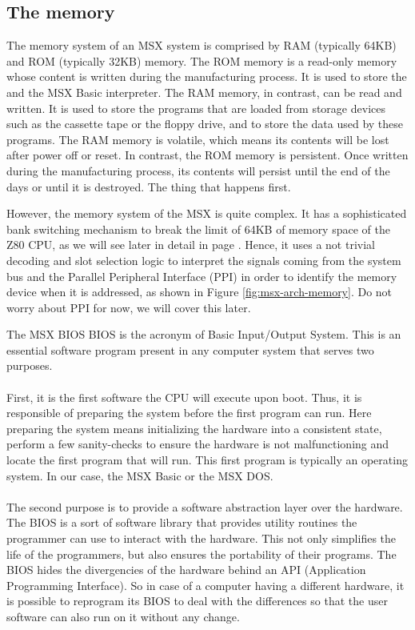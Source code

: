 \subsection{The memory}

The memory system of an MSX system is comprised by RAM (typically 64KB) and ROM (typically 32KB) memory. The ROM memory is a read-only memory whose content is written during the manufacturing process. It is used to store the  and the MSX Basic interpreter. The RAM memory, in contrast, can be read and written. It is used to store the programs that are loaded from storage devices such as the cassette tape or the floppy drive, and to store the data used by these programs. The RAM memory is volatile, which means its contents will be lost after power off or reset. In contrast, the ROM memory is persistent. Once written during the manufacturing process, its contents will persist until the end of the days or until it is destroyed. The thing that happens first.

However, the memory system of the MSX is quite complex. It has a sophisticated bank switching mechanism to break the limit of 64KB of memory space of the Z80 CPU, as we will see later in detail in page \pageref{sec:msx-mem-slots}. Hence, it uses a not trivial decoding and slot selection logic to interpret the signals coming from the system bus and the Parallel Peripheral Interface (PPI) in order to identify the memory device when it is addressed, as shown in Figure \ref{fig:msx-arch-memory}. Do not worry about PPI for now, we will cover this later. 

\begin{theory}{The MSX BIOS}
	BIOS is the acronym of Basic Input/Output System. This is an essential software program present in any computer system that serves two purposes.\\\\
	
	First, it is the first software the CPU will execute upon boot. Thus, it is responsible of preparing the system before the first program can run. Here preparing the system means initializing the hardware into a consistent state, perform a few sanity-checks to ensure the hardware is not malfunctioning and locate the first program that will run. This first program is typically an operating system. In our case, the MSX Basic or the MSX DOS.\\\\
	
	The second purpose is to provide a software abstraction layer over the hardware. The BIOS is a sort of software library that provides utility routines the programmer can use to interact with the hardware. This not only simplifies the life of the programmers, but also ensures the portability of their programs. The BIOS hides the divergencies of the hardware behind an API (Application Programming Interface). So in case of a computer having a different hardware, it is possible to reprogram its BIOS to deal with the differences so that the user software can also run on it without any change.
\end{theory}


